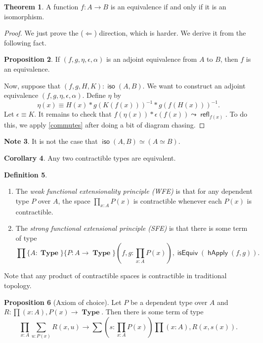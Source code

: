 \documentclass[10pt,letterpaper,cm]{nupset}
\theoremstyle{definition}
\newtheorem{definition}{Definition}[subsection]
\newtheorem{note}[definition]{Note}
\theoremstyle{theorem}
\newtheorem{theorem}[definition]{Theorem}
\newtheorem{prop}[definition]{Proposition}
\newtheorem{corollary}[definition]{Corollary}
\theoremstyle{remark}
\newcommand{\1}{\mathbf{1}}
\newcommand{\0}{\vec 0}
\DeclareMathOperator{\iso}{\mathsf{iso}}
\DeclareMathOperator{\refl}{\mathsf{refl}}
\DeclareMathOperator{\isequiv}{\mathsf{isEquiv}}
\DeclareMathOperator{\happly}{\mathsf{hApply}}
\DeclareMathOperator{\type}{\mathbf{Type}}
\begin{document}
\begin{theorem}
A function $f : A \to B$ is an equivalence if and only if it is an isomorphism.
\end{theorem}
\begin{proof}
We just prove the ($\Longleftarrow$) direction, which is harder. We derive it from the following fact.
\begin{prop}
If $(f, g, \eta, \epsilon, \alpha)$ is an adjoint equivalence from $A$ to $B$, then $f$ is an equivalence.
\end{prop}
Now, suppose that $(f,g,H, K): \iso(A,B)$. We want to construct an adjoint equivalence $(f, g, \eta,  \epsilon, \alpha)$. Define $\eta$ by $$\eta(x) \equiv H(x) \ast g(K(f(x)))^{{-}1} \ast g(f(H(x)))^{{-}1}.$$ Let $\epsilon \equiv K$. 
It remains to check that $f(\eta(x)) \ast \epsilon(f(x)) \leadsto \refl_{f(x)}$.
To do this, we apply \cref{commutes} after doing a bit of diagram chasing.
\end{proof}

\begin{note}
It is not the case that $\iso(A,B) \simeq (A \simeq B)$.
\end{note}

\begin{corollary}
Any two contractible types are equivalent. 
\end{corollary}

\begin{definition} 
\begin{enumerate} $ $
\item The \textit{weak functional extensionality principle (WFE)} is that for any dependent type $P$ over $A$, the space $\prod_{x:A} {P(x)}$ is contractible whenever each $P(x)$ is contractible. 
\item The \textit{strong functional extensional principle (SFE)} is that there is some term of type $$\prod\{A: \type\}\{P: A \to \type\}(f,g: \prod_{x:A} P(x)), \isequiv(\happly(f,g)).$$
\end{enumerate}
\end{definition}

Note that any product of contractible spaces is contractible in traditional topology. 

\begin{prop}[Axiom of choice]
Let $P$ be a dependent type over $A$ and $R : \prod(x:A), P(x) \to \type$. Then there is some term of type $$\prod_{x:A}\sum_{u:P(x)} R(x, u) \to \sum(s:  \prod_{x:A} P(x)) \prod (x:A), R(x, s(x)) .$$
\end{prop}
\end{document}
